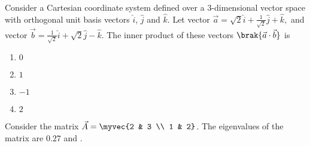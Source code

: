 		\item Consider a Cartesian coordinate system defined over a 3-dimensional vector space with orthogonal unit basis vectors $\hat{i}$, $\hat{j}$ and $\hat{k}$. Let vector $\vec{a}=\sqrt{2}\hat{i}+\frac{1}{\sqrt{2}}\hat{j}+\hat{k},$ and vector $\vec{b}=\frac{1}{\sqrt{2}}\hat{i}+\sqrt{2}\hat{j}-\hat{k}.$ The inner product of these vectors $\brak{\vec{a}\cdot \vec{b}}$ is
		\hfill{}
		\begin{multicols}{4}
			\begin{enumerate}
				\item $0$
				\item $1$
				\item $-1$
				\item $2$
			\end{enumerate}
		\end{multicols}
		\item Consider the matrix
		$ \vec{A} = \myvec{2 & 3 \\ 1 & 2}$. 
		The eigenvalues of the matrix are $0.27$ and \underline{\hspace{2cm}}.
		\hfill{}
